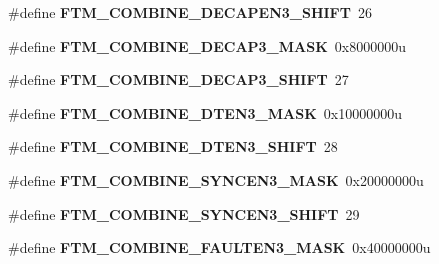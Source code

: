 \begin{DoxyCompactItemize}
\item 
\hypertarget{group___f_t_m___register___masks_ga4e05420ade8e9776e65f1b2f054465a5}{}\#define {\bfseries F\+T\+M\+\_\+\+C\+O\+M\+B\+I\+N\+E\+\_\+\+D\+E\+C\+A\+P\+E\+N3\+\_\+\+S\+H\+I\+F\+T}~26\label{group___f_t_m___register___masks_ga4e05420ade8e9776e65f1b2f054465a5}

\item 
\hypertarget{group___f_t_m___register___masks_ga9eed3afcff66166330a8ec14590a1808}{}\#define {\bfseries F\+T\+M\+\_\+\+C\+O\+M\+B\+I\+N\+E\+\_\+\+D\+E\+C\+A\+P3\+\_\+\+M\+A\+S\+K}~0x8000000u\label{group___f_t_m___register___masks_ga9eed3afcff66166330a8ec14590a1808}

\item 
\hypertarget{group___f_t_m___register___masks_ga691e558585a939559f4588bea64c099d}{}\#define {\bfseries F\+T\+M\+\_\+\+C\+O\+M\+B\+I\+N\+E\+\_\+\+D\+E\+C\+A\+P3\+\_\+\+S\+H\+I\+F\+T}~27\label{group___f_t_m___register___masks_ga691e558585a939559f4588bea64c099d}

\item 
\hypertarget{group___f_t_m___register___masks_ga53beef0d6bd400f7d10dff07a8e95802}{}\#define {\bfseries F\+T\+M\+\_\+\+C\+O\+M\+B\+I\+N\+E\+\_\+\+D\+T\+E\+N3\+\_\+\+M\+A\+S\+K}~0x10000000u\label{group___f_t_m___register___masks_ga53beef0d6bd400f7d10dff07a8e95802}

\item 
\hypertarget{group___f_t_m___register___masks_ga0534a71643db31f180f6918d19ad3409}{}\#define {\bfseries F\+T\+M\+\_\+\+C\+O\+M\+B\+I\+N\+E\+\_\+\+D\+T\+E\+N3\+\_\+\+S\+H\+I\+F\+T}~28\label{group___f_t_m___register___masks_ga0534a71643db31f180f6918d19ad3409}

\item 
\hypertarget{group___f_t_m___register___masks_ga9e631b38ed9e6cbf3a3afa812db96c21}{}\#define {\bfseries F\+T\+M\+\_\+\+C\+O\+M\+B\+I\+N\+E\+\_\+\+S\+Y\+N\+C\+E\+N3\+\_\+\+M\+A\+S\+K}~0x20000000u\label{group___f_t_m___register___masks_ga9e631b38ed9e6cbf3a3afa812db96c21}

\item 
\hypertarget{group___f_t_m___register___masks_ga429ad5d8c1f8afa7450531c8c0d6421d}{}\#define {\bfseries F\+T\+M\+\_\+\+C\+O\+M\+B\+I\+N\+E\+\_\+\+S\+Y\+N\+C\+E\+N3\+\_\+\+S\+H\+I\+F\+T}~29\label{group___f_t_m___register___masks_ga429ad5d8c1f8afa7450531c8c0d6421d}

\item 
\hypertarget{group___f_t_m___register___masks_ga2f56f45afa6694ded2489432d0be896f}{}\#define {\bfseries F\+T\+M\+\_\+\+C\+O\+M\+B\+I\+N\+E\+\_\+\+F\+A\+U\+L\+T\+E\+N3\+\_\+\+M\+A\+S\+K}~0x40000000u\label{group___f_t_m___register___masks_ga2f56f45afa6694ded2489432d0be896f}


\end{DoxyCompactItemize}
